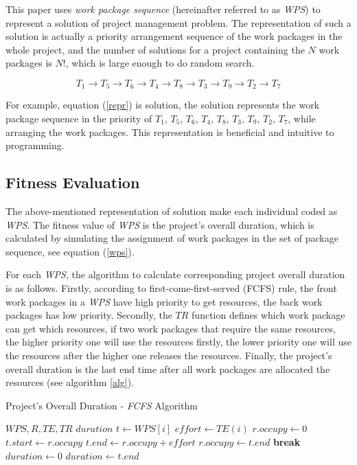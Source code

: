 This paper uses \emph{work package sequence} (hereinafter referred to as \emph{WPS}) to
represent a solution of project management problem. The representation of such a
solution is actually a priority arrangement sequence of the work packages in
the whole project, and the number of solutions for a project containing the $N$
work packages is $N!$, which is large enough to do random search.

\begin{equation}
  T_1 \rightarrow T_5 \rightarrow T_6 \rightarrow T_4 \rightarrow T_8
  \rightarrow T_3 \rightarrow T_9 \rightarrow T_2 \rightarrow T_7
  \label{repr}
\end{equation}

For example, equation (\ref{repr}) is solution, the solution represents the work
package sequence in the priority of $T_1$, $T_5$, $T_6$, $T_4$, $T_8$, $T_3$,
$T_9$, $T_2$, $T_7$, while arranging the work packages. This representation is
beneficial and intuitive to programming.


\subsection{Fitness Evaluation}
%
The above-mentioned representation of solution make each individual coded as
\emph{WPS}. The fitness value of \emph{WPS} is the project's overall duration,
which is calculated by simulating the assignment of work packages in the set of
package sequence, see equation (\ref{wps}).

For each \emph{WPS}, the algorithm to calculate corresponding project overall
duration is as follows. Firstly, according to first-come-first-served (FCFS)
rule, the front work packages in a \emph{WPS} have high priority to get
resources, the back work packages has low priority. Secondly, the $TR$ function
defines which work package can get which resources, if two work packages that
require the same resources, the higher priority one will use the resources
firstly, the lower priority one will use the resources after the higher one
releases the resources. Finally, the project's overall duration is the last end
time after all work packages are allocated the resources (see algorithm
\ref{alg}).


\begin{algorithm}
  \caption{Project's Overall Duration - \emph{FCFS} Algorithm}
  \label{alg}
  \begin{algorithmic}
    \REQUIRE $WPS, R, TE, TR$
    \ENSURE $duration$
      \STATE $t \gets WPS[i]$
      \STATE $ effort \gets TE(i)$
        \STATE $r.occupy \gets 0$
      \ENDFOR 
          \STATE $t.start \gets r.occupy$
          \STATE $t.end \gets r.occupy + effort$
          \STATE $r.occupy \gets t.end$
          \STATE \textbf{break}
        \ENDIF
      \ENDFOR
    \ENDFOR
    \STATE $duration \gets 0$  
        \STATE $duration \gets t.end$
      \ENDIF
    \ENDFOR
  \end{algorithmic}
\end{algorithm}

